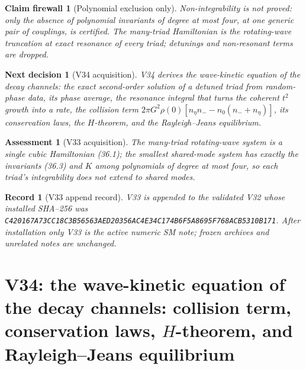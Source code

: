 \documentclass[11pt]{article}
\newtheorem{firewall}[theorem]{Claim firewall}
\newtheorem{decision}[theorem]{Next decision}
\newtheorem{assessment}[theorem]{Assessment}
\newtheorem{record}[theorem]{Record}
\theoremstyle{remark}
\begin{document}
\begin{firewall}[Polynomial exclusion only]
\label{fire:v20v33}
Non-integrability is not proved: only the absence of polynomial
invariants of degree at most four, at one generic pair of couplings,
is certified.  The many-triad Hamiltonian is the rotating-wave
truncation at exact resonance of every triad; detunings and
non-resonant terms are dropped.
\end{firewall}

\begin{decision}[V34 acquisition]
\label{dec:v20v33-next}
V34 derives the wave-kinetic equation of the decay channels: the
exact second-order solution of a detuned triad from random-phase
data, its phase average, the resonance integral that turns the
coherent \(t^2\) growth into a rate, the collision term
\(2\pi G^2\rho(0)[n_\eta n_--n_0(n_-+n_\eta)]\), its conservation laws,
the \(H\)-theorem, and the Rayleigh--Jeans equilibrium.
\end{decision}

\begin{assessment}[V33 acquisition]
\label{ass:v20v33}
The many-triad rotating-wave system is a single cubic Hamiltonian
(36.1); the smallest shared-mode system has exactly the invariants
(36.3) and \(K\) among polynomials of degree at most four, so each
triad's integrability does not extend to shared modes.
\end{assessment}

\begin{record}[V33 append record]
\label{rec:v20v33}
V33 is appended to the validated V32 whose installed SHA--256 was
\texttt{C420167A73CC18C3B56563AED20356AC4E34C174B6F5A8695F768ACB5310B171}.
After installation only V33 is the active numeric SM note; frozen
archives and unrelated notes are unchanged.
\end{record}


\section{V34: the wave-kinetic equation of the decay channels: collision term, conservation laws, \texorpdfstring{$H$}{H}-theorem, and Rayleigh--Jeans equilibrium}
\label{sec:v20v34}
\end{document}
